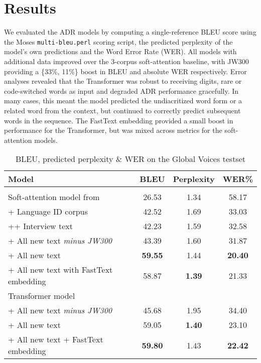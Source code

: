 \documentclass{article} %
\begin{document}
\section{Results}\label{sec:results}
We evaluated the ADR models by computing a single-reference BLEU score using the Moses \texttt{multi-bleu.perl} scoring script, the predicted perplexity of the model's own predictions and the Word Error Rate (WER). All models with additional data improved over the 3-corpus soft-attention baseline, with JW300 providing a \{33\%, 11\%\}  boost in BLEU and absolute WER respectively. Error analyses revealed that the Transformer was robust to receiving digits, rare or code-switched words as input and degraded ADR performance gracefully. In many cases, this meant the model predicted the undiacritized word form or a related word from the context, but continued to correctly predict subsequent words in the sequence. The FastText embedding provided a small boost in performance for the Transformer, but was mixed across metrics for the soft-attention models. 
 \begin{table}[h]
  \caption{BLEU, predicted perplexity \& WER on the Global Voices testset}
  \label{tab:results-appendix}
 \begin{center}
  \begin{tabular}{lccc}
    \toprule
    \textbf{Model} & \textbf{BLEU} &\textbf{Perplexity} &\textbf{WER\%}\\
    \bottomrule
    \\
    Soft-attention model from \citep{orife2018adr} & 26.53 & 1.34 & 58.17 \\
    \midrule
	\hspace{5mm} + Language ID corpus & 42.52 & 1.69 & 33.03 \\ 
	\hspace{10mm} ++ Interview text & 42.23 & 1.59 & 32.58 \\
	\hspace{5mm} + All new text \it{minus} JW300 & 43.39 & 1.60 & 31.87 \\ 
	\hspace{5mm} + All new text & \textbf{59.55} & 1.44 & \textbf{20.40}\\ 
	\hspace{5mm} + All new text with FastText embedding & 58.87 & \textbf{1.39} & 21.33 \\ 
    \midrule
	Transformer model \\
	 \hspace{5mm} + All new text \it{minus} JW300 & 45.68 & 1.95 & 34.40\\
	 \hspace{5mm} + All new text & 59.05 & \textbf{1.40} &  23.10\\
	 \hspace{5mm} + All new text + FastText embedding & \textbf{59.80} & 1.43 & \textbf{22.42}\\ 
    \bottomrule
  \end{tabular}
  \end{center}
\end{table}
\end{document}
